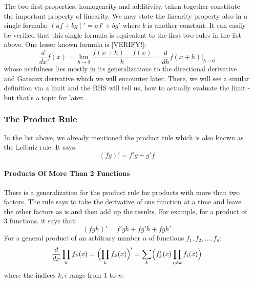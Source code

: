 The two first properties, homogeneity and additivity, taken together constitute the important property of linearity. We may state the linearity property also in a single formula: $(a f + b g)' = a f' + b g'$ where $b$ is another constant. It can easily be verified that this single formula is equivalent to the first two rules in the list above. One lesser known formula is [VERIFY!]:
\begin{equation}
\label{Eq:DerivativeViaH}
 \frac{d}{d x} f(x) 
 = \lim_{h \rightarrow 0} \frac{f(x + h) - f(x)}{h}
 = \frac{d}{d h} f(x + h) \bigg\rvert_{h=0}
\end{equation}
whose usefulness lies mostly in its generalizations to the directional derivative and Gateaux derivative which we will encounter later. There, we will see a similar definition via a limit and the RHS will tell us, how to actually evaluate the limit - but that's a topic for later. 



\subsubsection{The Product Rule}
In the list above, we already mentioned the product rule which is also known as the Leibniz rule. It says:
\begin{equation}
 (f g)'  = f' g + g' f
\end{equation}

\paragraph{Products Of More Than 2 Functions}

There is a generalization for the product rule for products with more than two factors. The rule says to take the derivative of one function at a time and leave the other factors as is and then add up the results. For example, for a product of 3 functions, it says that:
\begin{equation}
(fgh)' =  f' g h + f g' h + f g h'
\end{equation}
For a general product of an arbitrary number $n$ of functions $f_1, f_2, \ldots, f_n$:
\begin{equation}
\frac{d}{dx} \prod_k f_k(x)  
= \Bigl(  \prod_k f_k(x)   \Bigr) '
= \sum_k \Bigl( f_k'(x) \prod_{i \neq k} f_i(x)  \Bigr) 
\end{equation}
where the indices $k,i$ range from $1$ to $n$.

